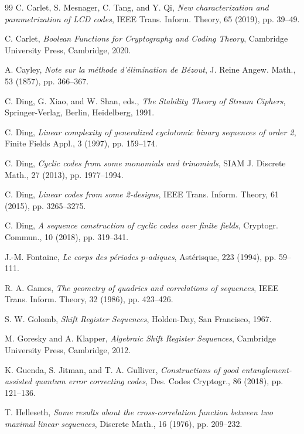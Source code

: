 \documentclass[hidelinks,onefignum,onetabnum]{siamart251216}
\theoremstyle{definition}
\theoremstyle{remark}
\begin{document}
\begin{thebibliography}{99}
	C. Carlet, S. Mesnager, C. Tang, and Y. Qi, \emph{New characterization and parametrization of LCD codes}, IEEE Trans. Inform. Theory, 65 (2019), pp. 39--49.
	
	C. Carlet, \emph{Boolean Functions for Cryptography and Coding Theory}, Cambridge University Press, Cambridge, 2020.
	
	A. Cayley, \emph{Note sur la m{\'e}thode d'{\'e}limination de B{\'e}zout}, J. Reine Angew. Math., 53 (1857), pp. 366--367.
	
	C. Ding, G. Xiao, and W. Shan, eds., \emph{The Stability Theory of Stream Ciphers}, Springer-Verlag, Berlin, Heidelberg, 1991.
	
	C. Ding, \emph{Linear complexity of generalized cyclotomic binary sequences of order 2}, Finite Fields Appl., 3 (1997), pp. 159--174.
	
	C. Ding, \emph{Cyclic codes from some monomials and trinomials}, SIAM J. Discrete Math., 27 (2013), pp. 1977--1994.
	
	C. Ding, \emph{Linear codes from some 2-designs}, IEEE Trans. Inform. Theory, 61 (2015), pp. 3265--3275.
	
	C. Ding, \emph{A sequence construction of cyclic codes over finite fields}, Cryptogr. Commun., 10 (2018), pp. 319--341.
	
	J.-M. Fontaine, \emph{Le corps des p{\'e}riodes $p$-adiques}, Ast{\'e}risque, 223 (1994), pp. 59--111.
	
	R. A. Games, \emph{The geometry of quadrics and correlations of sequences}, IEEE Trans. Inform. Theory, 32 (1986), pp. 423--426.
	
	S. W. Golomb, \emph{Shift Register Sequences}, Holden-Day, San Francisco, 1967.
	
	M. Goresky and A. Klapper, \emph{Algebraic Shift Register Sequences}, Cambridge University Press, Cambridge, 2012.
	
	K. Guenda, S. Jitman, and T. A. Gulliver, \emph{Constructions of good entanglement-assisted quantum error correcting codes}, Des. Codes Cryptogr., 86 (2018), pp. 121--136.
	
	T. Helleseth, \emph{Some results about the cross-correlation function between two maximal linear sequences}, Discrete Math., 16 (1976), pp. 209--232.
	

\end{thebibliography}
\end{document}

